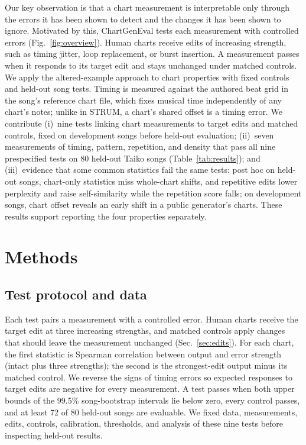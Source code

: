 \documentclass[letterpaper]{article}
\begin{document}
Our key observation is that a chart measurement is interpretable only
through the errors it has been shown to detect and the changes it has been
shown to ignore. Motivated by this, ChartGenEval tests each measurement with
controlled errors (Fig.~\ref{fig:overview}). Human charts receive edits of
increasing strength, such as timing jitter, loop replacement, or burst
insertion. A measurement passes when it responds to its target edit and
stays unchanged under matched controls. We apply the
altered-example approach to chart properties with fixed controls and
held-out song tests. Timing is measured against the authored beat grid in
the song's reference chart file, which fixes musical time independently of
any chart's notes; unlike in STRUM, a chart's shared offset is a timing
error. We contribute
(i)~nine tests linking chart measurements to target edits and matched
controls, fixed on development songs before held-out evaluation;
(ii)~seven measurements of timing, pattern, repetition, and density that
pass all nine prespecified tests
on 80 held-out Taiko songs (Table~\ref{tab:results}); and
(iii)~evidence that some common statistics fail the same tests: post hoc on
held-out songs, chart-only statistics miss whole-chart shifts, and
repetitive edits lower perplexity and raise self-similarity while the
repetition score falls; on development songs, chart offset reveals an early
shift in a public generator's charts. These results support reporting the
four properties separately.

\section{Methods}
\label{sec:methods}
\subsection{Test protocol and data}
\label{sec:validation}
Each test pairs a measurement with a controlled error. Human charts receive
the target edit at three increasing strengths, and matched controls apply
changes that should leave the measurement unchanged
(Sec.~\ref{sec:edits}). For each chart, the first statistic is Spearman
correlation between output and error strength (intact plus three
strengths); the second is the strongest-edit output minus its matched
control. We reverse the signs of timing errors so expected responses to
target edits are negative for every measurement. A test passes when both
upper bounds of the 99.5\% song-bootstrap intervals lie below zero, every
control passes, and at least 72 of 80 held-out songs are evaluable. We fixed data, measurements,
edits, controls, calibration, thresholds, and analysis of these nine tests
before inspecting held-out results.
\end{document}
